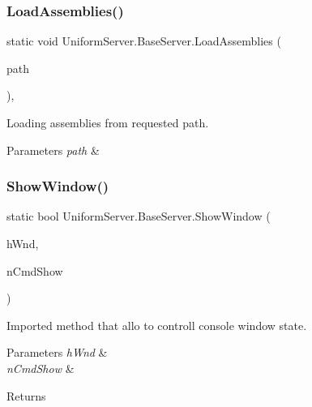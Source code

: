 \subsubsection{\texorpdfstring{Load\+Assemblies()}{LoadAssemblies()}}
{\footnotesize\ttfamily static void Uniform\+Server.\+Base\+Server.\+Load\+Assemblies (\begin{DoxyParamCaption}\item[{string}]{path }\end{DoxyParamCaption})\hspace{0.3cm}{\ttfamily [static]}, {\ttfamily [protected]}}



Loading assemblies from requested path. 


\begin{DoxyParams}{Parameters}
{\em path} & \\
\hline
\end{DoxyParams}
\mbox{\label{class_uniform_server_1_1_base_server_a16cf4f4f9de9d6d6586631640d3d867b}} 
\subsubsection{\texorpdfstring{Show\+Window()}{ShowWindow()}}
{\footnotesize\ttfamily static bool Uniform\+Server.\+Base\+Server.\+Show\+Window (\begin{DoxyParamCaption}\item[{Int\+Ptr}]{h\+Wnd,  }\item[{int}]{n\+Cmd\+Show }\end{DoxyParamCaption})\hspace{0.3cm}{\ttfamily [protected]}}



Imported method that allo to controll console window state. 


\begin{DoxyParams}{Parameters}
{\em h\+Wnd} & \\
\hline
{\em n\+Cmd\+Show} & \\
\hline
\end{DoxyParams}
\begin{DoxyReturn}{Returns}

\end{DoxyReturn}
\mbox{\label{class_uniform_server_1_1_base_server_a27e52ba4c6bc40a47795085a7e3d03cd}} 
